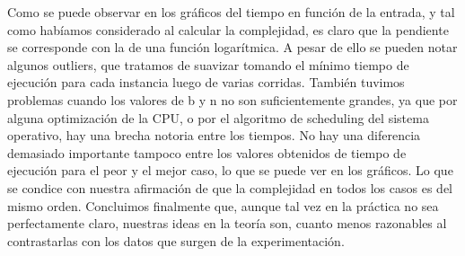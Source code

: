 Como se puede observar en los gráficos del tiempo en función de la entrada, y tal como habíamos considerado al calcular la complejidad, es claro que la pendiente se corresponde con la de una función logarítmica. A pesar de ello se pueden notar algunos outliers, que tratamos de suavizar tomando el mínimo tiempo de ejecución para cada instancia luego de varias corridas. También tuvimos problemas cuando los valores de b y n no son suficientemente grandes, ya que por alguna optimización de la CPU, o por el algoritmo de scheduling del sistema operativo, hay una brecha notoria entre los tiempos.
\newline
No hay una diferencia demasiado importante tampoco entre los valores obtenidos de tiempo de ejecución para el peor y el mejor caso, lo que se puede ver en los gráficos. Lo que se condice con nuestra afirmación de que la complejidad en todos los casos es del mismo orden.
\newline
Concluimos finalmente que, aunque tal vez en la práctica no sea perfectamente claro, nuestras ideas en la teoría son, cuanto menos razonables al contrastarlas con los datos que surgen de la experimentación.